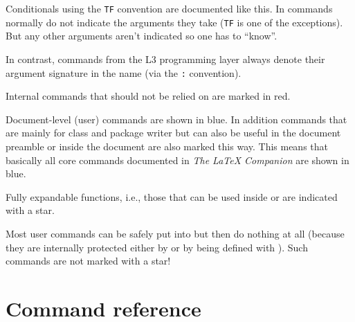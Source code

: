 \documentclass{l3in2edoc}
\begin{document}
\begin{function}[TF]
  {
    \foo
  }
  \begin{syntax}
      
  \end{syntax}
  Conditionals using the \texttt{TF} convention are documented like
  this.  In \LaTeXe{} commands normally do not indicate the arguments
  they take (\texttt{TF} is one of the exceptions). But any other
  arguments aren't indicated so one has to \enquote{know}.

  In contrast,
  commands from the L3 programming layer always denote their argument
  signature in the name (via the \texttt{:} convention).
  
\end{function}

\begin{function}[int]
  {
    \foo
  }
  Internal commands that should not be relied on are marked in red.
  
\end{function}

\begin{function}[user]
  {
    \foo
  }
  \begin{syntax}
  \end{syntax}
  Document-level (user) commands are shown in blue. In addition
  commands that are mainly for class and package writer but can also
  be useful in the document preamble or inside the document are also
  marked this way. This means that basically all core commands
  documented in \emph{The LaTeX{} Companion}\cite{tlc3} are shown in
  blue.
  
\end{function}

\begin{function}[EXP]
  {
    \foo
  }
  Fully expandable functions, i.e., those that can be used
  inside  or  are indicated with a star.

  Most user commands can be safely put into  but then do
  nothing at all (because they are internally protected either
  by  or by being defined with ). Such
  commands are not marked with a star!
  
\end{function}



\newpage


\section{Command reference}
\end{document}
